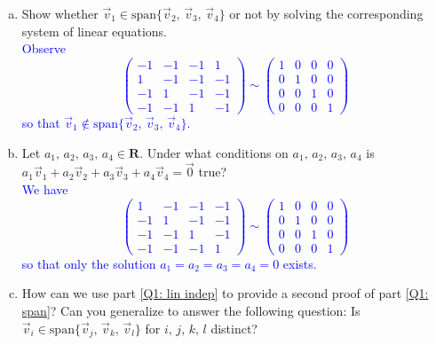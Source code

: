 \documentclass[a4paper,11pt]{article}
\newcommand{\R}{\mathbf{R}}
\newcommand{\BB}[1]{\textcolor{blue}{#1}}
\begin{document}
\begin{enumerate}[(a)]
\item\label{Q1: span} Show whether $\vec v_1 \in \text{span}\{\vec v_2,\,\vec
  v_3,\,\vec v_4\}$ 
  or not by solving the corresponding system of linear equations. \\

  \BB{Observe
    \[
      \left(
        \begin{array}{rrr|r}
          -1 & -1 & -1 & 1 \\
          1 & -1 & -1 & -1 \\
          -1 & 1 & -1 & -1 \\
          -1 & -1 & 1 & -1
        \end{array}
      \right) 
      \sim
      \left(
        \begin{array}{rrr|r}
          1 & 0 & 0 & 0 \\
          0 & 1 & 0 & 0 \\
          0 & 0 & 1 & 0 \\
          0 & 0 & 0 & 1
        \end{array}
      \right)
    \] so that $\vec v_1 \notin \text{span}\{\vec v_2,\,\vec v_3,\,\vec v_4\}$. \\
  }
  
\item\label{Q1: lin indep} Let $a_1,\,a_2,\,a_3,\,a_4 \in \R$. Under what
  conditions on $a_1,\,a_2,\,a_3,\,a_4$ is $a_1\vec v_1+a_2\vec v_2+a_3\vec
  v_3+a_4\vec v_4=\vec{0}$ true? \\

  \BB{We have
    \[
      \left(
        \begin{array}{rrrr}
          1 & -1 & -1 & -1 \\
          -1 & 1 & -1 & -1 \\
          -1 & -1 & 1 & -1 \\
          -1 & -1 & -1 & 1
        \end{array}
      \right) 
      \sim
      \left(
        \begin{array}{rrrr}
          1 & 0 & 0 & 0 \\
          0 & 1 & 0 & 0 \\
          0 & 0 & 1 & 0 \\
          0 & 0 & 0 & 1
        \end{array}
      \right)
    \]
    so that only the solution $a_1=a_2=a_3=a_4=0$ exists. \\
  }
  
\item How can we use part \ref{Q1: lin indep} to provide a second proof of part
  \ref{Q1: span}? Can you generalize to answer the following question: Is $\vec
  v_i \in \text{span}\{\vec v_j,\,\vec v_k,\,\vec v_l\}$ for $i,\,j,\,k,\,l$
  distinct? \\


\end{enumerate}
\end{document}
